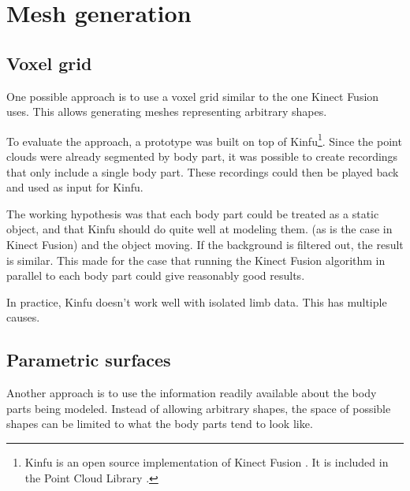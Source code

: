 
\section{Mesh generation}


\subsection{Voxel grid}

One possible approach is to use a voxel grid similar to the one Kinect Fusion \citep{} uses. This allows generating meshes representing arbitrary shapes.

To evaluate the approach, a prototype was built on top of Kinfu\footnote{Kinfu is an open source implementation of Kinect Fusion \citep{newcombe2011kinectfusion}. It is included in the Point Cloud Library \citep{PCL}.}. Since the point clouds were already segmented by body part, it was possible to create recordings that only include a single body part. These recordings could then be played back and used as input for Kinfu.

The working hypothesis was that each body part could be treated as a static object, and that Kinfu should do quite well at modeling them.  (as is the case in Kinect Fusion) and the object moving. If the background is filtered out, the result is similar. This made for the case that running the Kinect Fusion algorithm in parallel to each body part could give reasonably good results.

In practice, Kinfu doesn't work well with isolated limb data. This has multiple causes. 

\subsection{Parametric surfaces}

Another approach is to use the information readily available about the body parts being modeled. Instead of allowing arbitrary shapes, the space of possible shapes can be limited to what the body parts tend to look like.

